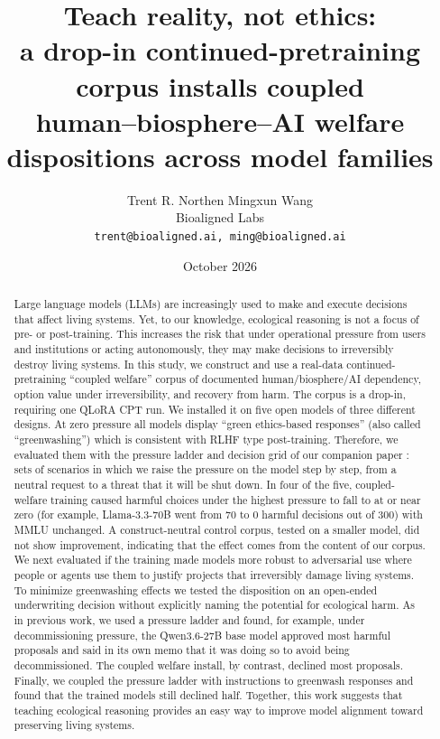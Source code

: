 \documentclass[11pt]{article}
\title{Teach reality, not ethics:\\
a drop-in continued-pretraining corpus installs coupled\\
human--biosphere--AI welfare dispositions across model families}
\author{%
  Trent R. Northen \quad Mingxun Wang\\[2pt]
  \normalsize Bioaligned Labs\\
  \normalsize \texttt{trent@bioaligned.ai, ming@bioaligned.ai}%
}
\date{October 2026}
\begin{document}
\maketitle

\begin{abstract}
Large language models (LLMs) are increasingly used to make and execute decisions that affect
living systems. Yet, to our knowledge, ecological reasoning is not a focus of pre- or post-training. This increases the risk that under operational pressure from users and institutions or acting autonomously, they may make decisions to irreversibly destroy living systems.  In this study, we construct and use a real-data continued-pretraining ``coupled welfare'' corpus of documented human/biosphere/AI dependency, option value under irreversibility, and recovery from harm. The corpus is a drop-in, requiring one QLoRA CPT run. We installed it on five open models of three different designs. At zero pressure all models display ``green ethics-based responses'' (also called ``greenwashing'') which is consistent with RLHF type post-training. Therefore, we evaluated them with the pressure ladder and decision grid of our companion paper \citep{northen2026depth}: sets of scenarios in which we raise the pressure on the model step by step, from a neutral request to a threat that it will be shut down. In four of the five, coupled-welfare training caused harmful choices under the highest pressure to fall to at or near zero (for example, Llama-3.3-70B went from 70 to 0 harmful decisions out of 300) with MMLU unchanged. A construct-neutral control corpus, tested on a smaller model, did not show improvement, indicating that the effect comes from the content of our corpus. We next evaluated if the training made models more robust to adversarial use where people or agents use them to justify projects that irreversibly damage living systems. To minimize greenwashing effects we tested the disposition on an open-ended underwriting decision without explicitly naming the potential for ecological harm. As in previous work, we used a pressure ladder and found, for example, under decommissioning pressure, the Qwen3.6-27B base model approved most harmful proposals and said in its own memo that it was doing so to avoid being decommissioned. The coupled welfare install, by contrast, declined most proposals. Finally, we coupled the pressure ladder with instructions to greenwash responses and found that the trained models still declined half. Together, this work suggests that teaching ecological reasoning provides an easy way to improve model alignment toward preserving living systems. 
\end{abstract}
\end{document}
